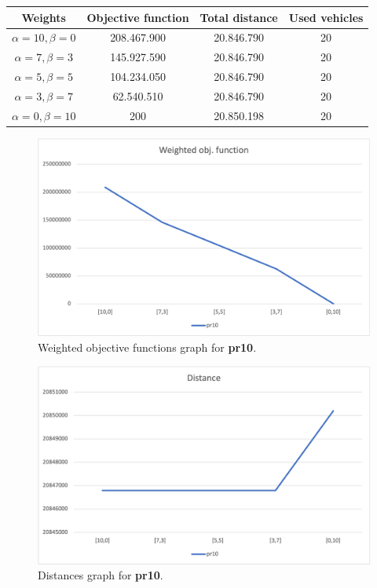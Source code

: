{
\renewcommand{\arraystretch}{2}
\begin{longtable}[h]{| c | c | c | c |}
    \hline
    \textbf{Weights} & \textbf{Objective function} & \textbf{Total distance} & \textbf{Used vehicles} \\
    \hline
    \endhead
    $\alpha = 10, \beta = 0$ & 208.467.900 & 20.846.790 & 20 \\
    \hline
    $\alpha = 7, \beta = 3$  & 145.927.590 & 20.846.790 & 20 \\
    \hline
    $\alpha = 5, \beta = 5$  & 104.234.050 & 20.846.790 & 20 \\
    \hline
    $\alpha = 3, \beta = 7$  &  62.540.510 & 20.846.790 & 20 \\
    \hline
    $\alpha = 0, \beta = 10$ &         200 & 20.850.198 & 20 \\
    \hline
\end{longtable}
}
\begin{figure}[H]
    \centering
    \includegraphics[height=0.25\textheight]{../graphs/pr10-wobjf.png}
    \caption{Weighted objective functions graph for \textbf{pr10}.}
\end{figure}

\begin{figure}[H]
    \centering
    \includegraphics[height=0.25\textheight]{../graphs/pr10-distance.png}
    \caption{Distances graph for \textbf{pr10}.}
\end{figure}

